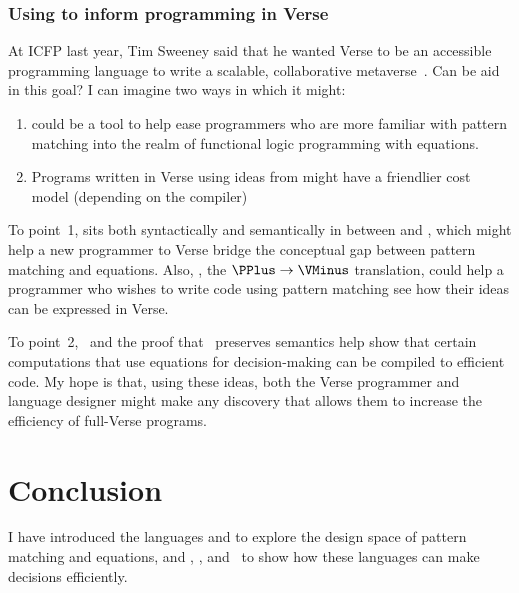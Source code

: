 \documentclass[manuscript,screen,review, 12pt, nonacm]{acmart}
\begin{document}
        \subsubsection{Using \VMinus to inform programming in Verse}
        \label{vminusandvc}
        
        At ICFP last year, Tim Sweeney said that he wanted Verse to be an
        accessible programming language to write a scalable, collaborative
        metaverse~\citep{timtalk}. Can \VMinus be aid in this goal? I can imagine
        two ways in which it might:
        
        \begin{enumerate}
            \item \VMinus could be  a tool to help ease programmers who are
            more familiar with pattern matching into the realm of functional
            logic programming with equations. 
            \item Programs written in Verse using ideas from \VMinus might have
            a friendlier cost model (depending on the compiler)
        \end{enumerate}
        
        To point~1, \VMinus sits both syntactically and semantically in between
        \PPlus and \VC, which might help a new programmer to Verse bridge the
        conceptual gap between pattern matching and equations. Also, \PtoVTran,
        the $\PPlus \rightarrow \VMinus$ translation, could help a programmer 
        who wishes to write code using pattern matching see how their ideas 
        can be expressed in Verse. 

        To point~2, \DTran\ and the proof that \DTran\ preserves semantics help
        show that certain computations that use equations for decision-making
        can be compiled to efficient code. My hope is that, using these ideas,
        both the Verse programmer and language designer might make any discovery
        that allows them to increase the efficiency of full-Verse programs. 

    \section{Conclusion}

    I have introduced the languages \PPlus and \VMinus to explore the design
    space of pattern matching and equations, and \D, \PtoVTran, and \DTran\ to
    show how these languages can make decisions efficiently. 
\end{document}
